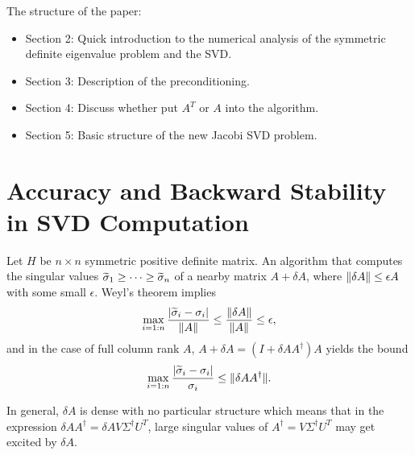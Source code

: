 \documentclass{article}
\begin{document}
The structure of the paper:
\begin{itemize}
\item Section 2: Quick introduction to the numerical analysis of the
  symmetric definite eigenvalue problem and the SVD.
\item Section 3: Description of the preconditioning.
\item Section 4: Discuss whether put $A^T$ or $A$ into the algorithm. 
\item Section 5: Basic structure of the new Jacobi SVD problem.
\end{itemize}

\section{Accuracy and Backward Stability in SVD Computation}

Let $H$ be $n\times n$ symmetric positive definite matrix. An algorithm
that computes the singular values $\widetilde \sigma_1\geq \cdots \geq \widetilde
\sigma_n$ of a nearby matrix $A + \delta A$, where $\|{\delta
  A}\|\leq\epsilon A$ with some small $\epsilon$. Weyl's theorem implies 
\begin{equation}\notag
  \max_{i=1:n}\frac{|\widetilde \sigma_i-\sigma_i|}{\|{A}\|}\leq
\frac{\|{\delta A}\|}{\|{A}\|} \le \epsilon,
\end{equation}
and in the case of full column rank $A$, $A+\delta A = (I+\delta A
A^{\dagger})A$ yields the bound 
\begin{equation}\label{eq:fwd-error-sv}
  \max_{i=1:n}\frac{|\widetilde \sigma_i-\sigma_i|}{\sigma_i} \leq 
\|{\delta A A^{\dagger}}\|.
\end{equation}

In general, $\delta A$ is dense with no particular structure which means
that in the expression $\delta AA^{\dagger} = \delta
AV\Sigma^{\dagger}U^T$, large singular values of $A^{\dagger} =
V\Sigma^{\dagger}U^T$ may get excited by $\delta A$.
\end{document}
